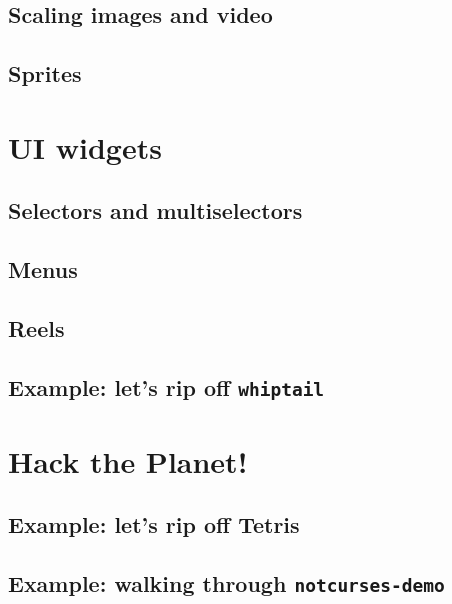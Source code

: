 \documentclass[letterpaper,10pt]{article}
\begin{document}
\subsection{Scaling images and video}
\subsection{Sprites}

\section{UI widgets}
\label{section:uiwidgets}
\subsection{Selectors and multiselectors}
\subsection{Menus}
\subsection{Reels}
\subsection{Example: let's rip off \texttt{whiptail}}

\section{Hack the Planet!}
\subsection{Example: let's rip off Tetris}
\subsection{Example: walking through \texttt{notcurses-demo}}
\end{document}
